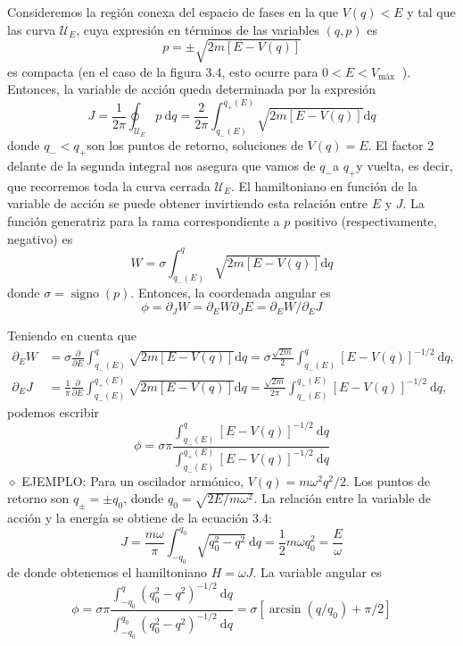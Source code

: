 Consideremos la región conexa del espacio de fases en la que $V(q)<E$ y tal que las curva $\mathscr{U}_{E}$, cuya expresión en términos de las variables $(q, p)$ es
$$
p= \pm \sqrt{2 m[E-V(q)]}
$$
es compacta (en el caso de la figura 3.4, esto ocurre para $0<E<V_{\text {máx }}$ ). Entonces, la variable de acción queda determinada por la expresión
$$
\begin{equation*}
J=\frac{1}{2 \pi} \oint_{\mathscr{U}_{E}} p \mathrm{~d} q=\frac{2}{2 \pi} \int_{q_{-}(E)}^{q_{+}(E)} \sqrt{2 m[E-V(q)]} \mathrm{d} q \tag{3.4}
\end{equation*}
$$
donde $q_{-}<q_{+}$son los puntos de retorno, soluciones de $V(q)=E$. El factor 2 delante de la segunda integral nos asegura que vamos de $q_{-}$a $q_{+}$y vuelta, es
decir, que recorremos toda la curva cerrada $\mathscr{U}_{E}$. El hamiltoniano en función de la variable de acción se puede obtener invirtiendo esta relación entre $E$ y $J$. La función generatriz para la rama correspondiente a $p$ positivo (respectivamente, negativo) es
$$
W=\sigma \int_{q_{-}(E)}^{q} \sqrt{2 m[E-V(q)]} \mathrm{d} q
$$
donde $\sigma=\operatorname{signo}(p)$. Entonces, la coordenada angular es
$$
\phi=\partial_{J} W=\partial_{E} W \partial_{J} E=\partial_{E} W / \partial_{E} J
$$

Teniendo en cuenta que
$$
\begin{aligned}
\partial_{E} W & =\sigma \frac{\partial}{\partial E} \int_{q_{-}(E)}^{q} \sqrt{2 m[E-V(q)]} \mathrm{d} q=\sigma \frac{\sqrt{2 m}}{2} \int_{q_{-}(E)}^{q}[E-V(q)]^{-1 / 2} \mathrm{~d} q, \\
\partial_{E} J & =\frac{1}{\pi} \frac{\partial}{\partial E} \int_{q_{-}(E)}^{q_{+}(E)} \sqrt{2 m[E-V(q)]} \mathrm{d} q=\frac{\sqrt{2 m}}{2 \pi} \int_{q_{-}(E)}^{q_{+}(E)}[E-V(q)]^{-1 / 2} \mathrm{~d} q,
\end{aligned}
$$
podemos escribir
$$
\phi=\sigma \pi \frac{\int_{q_{-}(E)}^{q}[E-V(q)]^{-1 / 2} \mathrm{~d} q}{\int_{q_{-}(E)}^{q_{+}(E)}[E-V(q)]^{-1 / 2} \mathrm{~d} q}
$$
$\diamond$ EJEMPLO: Para un oscilador armónico, $V(q)=m \omega^{2} q^{2} / 2$. Los puntos de retorno son $q_{ \pm}= \pm q_{0}$, donde $q_{0}=\sqrt{2 E / m \omega^{2}}$. La relación entre la variable de acción y la energía se obtiene de la ecuación 3.4:
$$
J=\frac{m \omega}{\pi} \int_{-q_{0}}^{q_{0}} \sqrt{q_{0}^{2}-q^{2}} \mathrm{~d} q=\frac{1}{2} m \omega q_{0}^{2}=\frac{E}{\omega}
$$
de donde obtenemos el hamiltoniano $H=\omega J$. La variable angular es
$$
\phi=\sigma \pi \frac{\int_{-q_{0}}^{q}\left(q_{0}^{2}-q^{2}\right)^{-1 / 2} \mathrm{~d} q}{\int_{-q_{0}}^{q_{0}}\left(q_{0}^{2}-q^{2}\right)^{-1 / 2} \mathrm{~d} q}=\sigma\left[\arcsin \left(q / q_{0}\right)+\pi / 2\right]
$$

